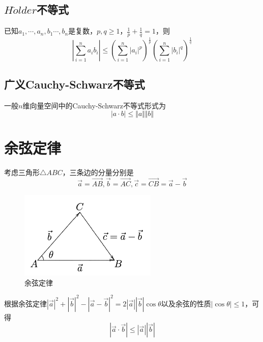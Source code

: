 \subsection*{$H\ddot{o}lder$不等式}
\begin{theorem}
    已知$a_1,\cdots,a_n,b_1\cdots,b_n$是复数，$p,q\geqslant 1$，$\frac{1}{p}+\frac{1}{q}=1$，则
    \begin{equation}
        |\sum\limits_{i=1}^{n}a_ib_i|\leqslant (\sum\limits_{i=1}^{n}|a_i|^p)^{\frac{1}{p}}
        (\sum\limits_{i=1}^{n}|b_i|^q)^{\frac{1}{q}} 
    \end{equation}
\end{theorem}

\subsection*{广义Cauchy-Schwarz不等式}

\begin{theorem}
    一般$n$维向量空间中的Cauchy-Schwarz不等式形式为
    \begin{equation}
        |a\cdot b|\leqslant \Vert a\Vert \Vert b\Vert
    \end{equation}
\end{theorem}

\section{余弦定律}
考虑三角形$\bigtriangleup ABC$，三条边的分量分别是
\begin{equation}
    \overrightarrow{a}=\overrightarrow{AB},\overrightarrow{b}=\overrightarrow{AC},
    \overrightarrow{c}=\overrightarrow{CB}=\vec{a}-\vec{b}
\end{equation}

\begin{figure}[H]
    \centering
    \includegraphics[scale=0.6]{figures/余弦定律.png}
    \caption{余弦定律}
\end{figure}

根据余弦定律$|\vec{a}|^2+|\vec{b}|^2-|\vec{a}-\vec{b}|^2=2|\vec{a}||\vec{b}|\cos{\theta}$以及余弦的性质$|\cos{\theta}|\leqslant 1$，可得
\begin{equation}
    |\vec{a}\cdot\vec{b}|\leqslant |\vec{a}||\vec{b}|
\end{equation}

